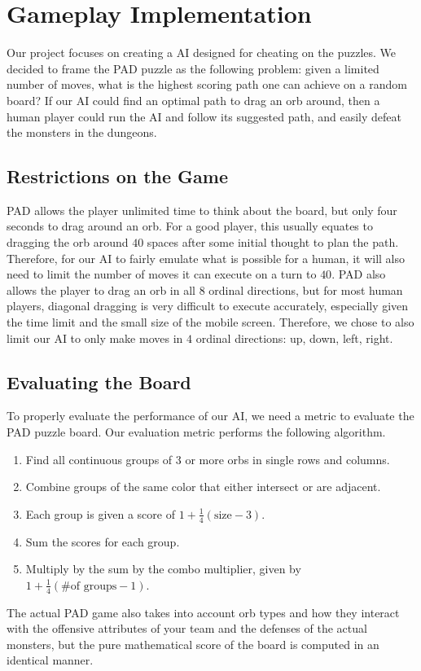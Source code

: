 \documentclass[journal,final,letterpaper,11pt]{IEEEtran}
\begin{document}
\section{Gameplay Implementation}
Our project focuses on creating a AI designed for cheating on the puzzles. We decided to frame the PAD puzzle as the following problem: given a limited number of moves, what is the highest scoring path one can achieve on a random board? If our AI could find an optimal path to drag an orb around, then a human player could run the AI and follow its suggested path, and easily defeat the monsters in the dungeons.
\vspace*{-0.1in}
\subsection{Restrictions on the Game}
PAD allows the player unlimited time to think about the board, but only four seconds to drag around an orb. For a good player, this usually equates to dragging the orb around $40$ spaces after some initial thought to plan the path. Therefore, for our AI to fairly emulate what is possible for a human, it will also need to limit the number of moves it can execute on a turn to $40$. PAD also allows the player to drag an orb in all $8$ ordinal directions, but for most human players, diagonal dragging is very difficult to execute accurately, especially given the time limit and the small size of the mobile screen. Therefore, we chose to also limit our AI to only make moves in $4$ ordinal directions: up, down, left, right.
\vspace*{-0.1in}
\subsection{Evaluating the Board}
To properly evaluate the performance of our AI, we need a metric to evaluate the PAD puzzle board. Our evaluation metric performs the following algorithm.
\begin{enumerate}
\item Find all continuous groups of 3 or more orbs in single rows and columns.
\item Combine groups of the same color that either intersect or are adjacent.
\item Each group is given a score of $1 + \frac{1}{4}(\mbox{size} - 3)$. \item Sum the scores for each group.
\item Multiply by the sum by the combo multiplier, given by $1 + \frac{1}{4}(\mbox{\# of groups} - 1)$.
\end{enumerate}
The actual PAD game also takes into account orb types and how they interact with the offensive attributes of your team and the defenses of the actual monsters, but the pure mathematical score of the board is computed in an identical manner.
\end{document}
